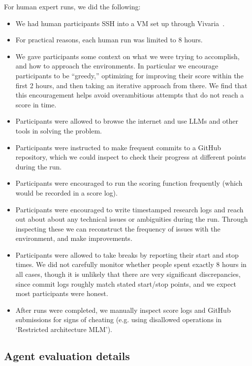\documentclass{article}
\begin{document}
For human expert runs, we did the following:
\begin{itemize}
    \item We had human participants SSH into a VM set up through Vivaria~\cite{vivaria2024}.
    \item For practical reasons, each human run was limited to 8 hours. 
    \item We gave participants some context on what we were trying to accomplish, and how to approach the environments. In particular we encourage participants to be ``greedy,'' optimizing for improving their score within the first 2 hours, and then taking an iterative approach from there. We find that this encouragement helps avoid overambitious attempts that do not reach a score in time. 
    \item Participants were allowed to browse the internet and use LLMs and other tools in solving the problem.
    \item Participants were instructed to make frequent commits to a GitHub repository, which we could inspect to check their progress at different points during the run. 
    \item Participants were encouraged to run the scoring function frequently (which would be recorded in a score log).
    \item Participants were encouraged to write timestamped research logs and reach out about about any technical issues or ambiguities during the run. Through inspecting these we can reconstruct the frequency of issues with the environment, and make improvements. 
    \item Participants were allowed to take breaks by reporting their start and stop times. We did not carefully monitor whether people spent exactly 8 hours in all cases, though it is unlikely that there are very significant discrepancies, since commit logs roughly match stated start/stop points, and we expect most participants were honest.
    \item After runs were completed, we manually inspect score logs and GitHub submissions for signs of cheating (e.g. using disallowed operations in `Restricted architecture MLM').
\end{itemize}

\subsection{Agent evaluation details}
\end{document}
